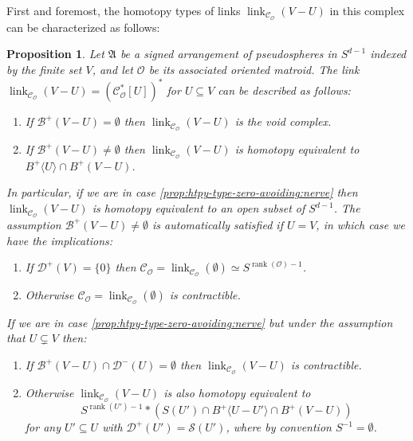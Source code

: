 \documentclass[a4paper,11pt,reqno, english]{amsart}
\newtheorem{proposition}[theorem]{Proposition}
\theoremstyle{definition}
\theoremstyle{remark}
\DeclareMathOperator{\link}{\mathrm{link}}
\begin{document}
First and foremost, the homotopy types of links $\link_{\mathscr{C}_\mathscr{O}}(V-U)$ in this complex can be characterized as follows:
\begin{proposition}\label{prop:htpy-type-zero-avoiding}
    Let $\mathfrak{A}$ be a signed arrangement of pseudospheres in $S^{d-1}$ indexed by the finite set $V$, and let $\mathscr{O}$ be its associated oriented matroid. The link $\link_{\mathscr{C}_\mathscr{O}}(V-U)=(\mathscr{C}^*_{\mathscr{O}}[U])^*$ for $U\subseteq V$ can be described as follows:
    \begin{enumerate}[label=\normalfont{(\arabic*)}]
        \item\label{prop:htpy-type-zero-avoiding:void} If $\mathscr{B}^+(V-U)=\emptyset$ then $\link_{\mathscr{C}_{\mathscr{O}}}(V-U)$ is the void complex.
        \item\label{prop:htpy-type-zero-avoiding:nerve} If $\mathscr{B}^+(V-U)\neq\emptyset$ then $\link_{\mathscr{C}_{\mathscr{O}}}(V-U)$ is homotopy equivalent to $B^+\langle U\rangle\cap B^+(V-U)$.
    \end{enumerate}
    In particular, if we are in case \ref{prop:htpy-type-zero-avoiding:nerve} then $\link_{\mathscr{C}_\mathscr{O}}(V-U)$ is homotopy equivalent to an open subset of $S^{d-1}$. The assumption $\mathscr{B}^+(V-U)\neq\emptyset$ is automatically satisfied if $U=V$, in which case we have the implications:
    \begin{enumerate}[label=\normalfont{(2.\arabic*)}]
        \item\label{prop:htpy-type-zero-avoiding:sphere} If $\mathscr{D}^+(V)=\{0\}$ then $\mathscr{C}_\mathscr{O}=\link_{\mathscr{C}_\mathscr{O}}(\emptyset)\simeq S^{\operatorname{rank}(\mathscr{O})-1}$.
        \item\label{prop:htpy-type-zero-avoiding:entire-contr} Otherwise $\mathscr{C}_\mathscr{O}=\link_{\mathscr{C}_\mathscr{O}}(\emptyset)$ is contractible.
    \end{enumerate}
    If we are in case \ref{prop:htpy-type-zero-avoiding:nerve} but under the assumption that $U\subsetneq V$ then:
    \begin{enumerate}[resume,label=\normalfont{(2.\arabic*)}]
        \item\label{prop:htpy-type-zero-avoiding:non-Farkas} If $\mathscr{B}^+(V-U)\cap \mathscr{D}^-(U)=\emptyset$ then $\link_{\mathscr{C}_{\mathscr{O}}}(V-U)$ is contractible.
        \item\label{prop:htpy-type-zero-avoiding:boundary} Otherwise $\link_{\mathscr{C}_\mathscr{O}}(V-U)$ is also homotopy equivalent to
        \[
            S^{\operatorname{rank}(U')-1}*\left(S(U')\cap B^+\langle U-U'\rangle\cap B^+(V-U)\right)
        \]
        for any $U'\subseteq U$ with $\mathscr{D}^+(U')=\mathscr{S}(U')$, where by convention $S^{-1}=\emptyset$.
    \end{enumerate}
\end{proposition}
\end{document}
